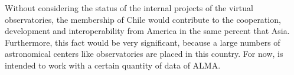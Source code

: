 Without considering the status of the internal projects of the virtual
observatories, the membership of Chile would contribute to the cooperation,
development and interoperability from America in the same percent that Asia.
Furthermore, this fact would be very significant, because a large numbers of
astronomical centers like observatories are placed in this country.  For now,
is intended to work with a certain quantity of data of ALMA.\\
